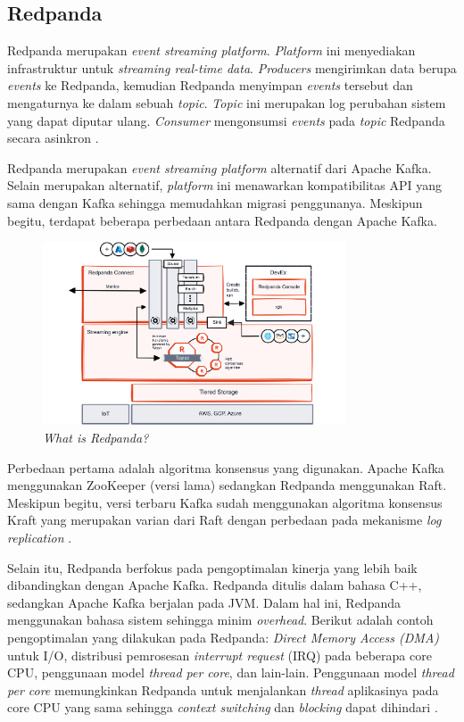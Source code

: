 \subsection{Redpanda}

Redpanda merupakan \textit{event streaming platform}. \textit{Platform} ini menyediakan infrastruktur untuk \textit{streaming real-time data}. \textit{Producers} mengirimkan data berupa \textit{events} ke Redpanda, kemudian Redpanda menyimpan \textit{events} tersebut dan mengaturnya ke dalam sebuah \textit{topic}. \textit{Topic} ini merupakan log perubahan sistem yang dapat diputar ulang. \textit{Consumer} mengonsumsi \textit{events} pada \textit{topic} Redpanda secara asinkron \parencite{redpandaIntro}.

Redpanda merupakan \textit{event streaming platform} alternatif dari Apache Kafka. Selain merupakan alternatif, \textit{platform} ini menawarkan kompatibilitas API yang sama dengan Kafka sehingga memudahkan migrasi penggunanya. Meskipun begitu, terdapat beberapa perbedaan antara Redpanda dengan Apache Kafka.

\begin{figure}[ht]
    \centering
    \includegraphics[width=0.8\textwidth]{resources/chapter-2/redpanda.png}
    \caption{\textit{What is Redpanda? \parencite{whatIsRedpanda}}}
    \label{fig:what-is-redpanda}
\end{figure}

Perbedaan pertama adalah algoritma konsensus yang digunakan. Apache Kafka menggunakan ZooKeeper (versi lama) sedangkan Redpanda menggunakan Raft. Meskipun begitu, versi terbaru Kafka sudah menggunakan algoritma konsensus Kraft yang merupakan varian dari Raft dengan perbedaan pada mekanisme \textit{log replication} \parencite{raftKraft}.

Selain itu, Redpanda berfokus pada pengoptimalan kinerja yang lebih baik dibandingkan dengan Apache Kafka. Redpanda ditulis dalam bahasa C++, sedangkan Apache Kafka berjalan pada JVM. Dalam hal ini, Redpanda menggunakan bahasa sistem sehingga minim \textit{overhead}. Berikut adalah contoh pengoptimalan yang dilakukan pada Redpanda: \textit{Direct Memory Access (DMA)} untuk I/O, distribusi pemrosesan \textit{interrupt request} (IRQ) pada beberapa core CPU, penggunaan model \textit{thread per core}, dan lain-lain. Penggunaan model \textit{thread per core} memungkinkan Redpanda untuk menjalankan \textit{thread} aplikasinya pada core CPU yang sama sehingga \textit{context switching} dan \textit{blocking} dapat dihindari \parencite{redpandaArchitecture}.